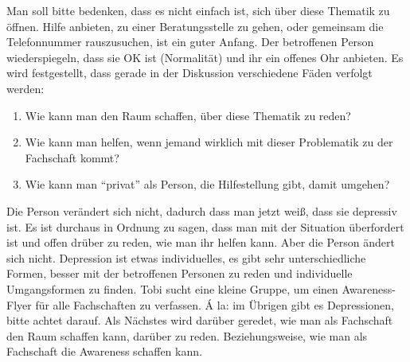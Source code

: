     Man soll bitte bedenken, dass es nicht einfach ist, sich über diese Thematik zu öffnen.
    Hilfe anbieten, zu einer Beratungsstelle zu gehen, oder gemeinsam die Telefonnummer rauszusuchen, ist ein guter Anfang.
    Der betroffenen Person wiederspiegeln, dass sie OK ist (Normalität) und ihr ein offenes Ohr anbieten.
    Es wird festgestellt, dass gerade in der Diskussion verschiedene Fäden verfolgt werden:
    \begin{enumerate}
      \item Wie kann man den Raum schaffen, über diese Thematik zu reden?
      \item Wie kann man helfen, wenn jemand wirklich mit dieser Problematik zu der Fachschaft kommt?
      \item Wie kann man ``privat'' als Person, die Hilfestellung gibt, damit umgehen?
    \end{enumerate}
    Die Person verändert sich nicht, dadurch dass man jetzt weiß, dass sie depressiv ist. Es ist durchaus in Ordnung zu sagen, dass man mit der Situation überfordert ist und offen drüber zu reden, wie man ihr helfen kann. Aber die Person ändert sich nicht.
    Depression ist etwas individuelles, es gibt sehr unterschiedliche Formen, besser mit der betroffenen Personen zu reden und individuelle Umgangsformen zu finden.
    Tobi sucht eine kleine Gruppe, um einen Awareness-Flyer für alle Fachschaften zu verfassen. Á la: im Übrigen gibt es Depressionen, bitte achtet darauf.
    Als Nächstes wird darüber geredet, wie man als Fachschaft den Raum schaffen kann, darüber zu reden. Beziehungsweise, wie man als Fachschaft die Awareness schaffen kann. \\


